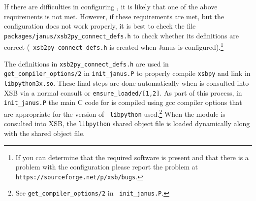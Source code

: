 %
%
%
%
%

If there are difficulties in configuring \janusplg , it is likely that
one of the above requirements is not met.  However, if these
requirements are met, but the configuration does not work properly, it
is best to check the file {\tt packages/janus/xsb2py\_connect\_defs.h}
to check whether its definitions are correct ({\tt
  xsb2py\_connect\_defs.h} is created when Janus is
configured).\footnote{If you can determine that the required software
is present and that there is a problem with the configuration please
report the problem at {\tt https://sourceforge.net/p/xsb/bugs}.}

The definitions in {\tt xsb2py\_connect\_defs.h} are used in {\tt
  get\_compiler\_options/2} in {\tt init\_janus.P} to properly compile
{\tt xsbpy} and link in {\tt libpython3x.so}.  These final steps are
done automatically when \janusplg{} is consulted into XSB via a normal
consult or {\tt ensure\_loaded/[1,2]}.  As part of this process, in
{\tt init\_janus.P} the main C code for  \janusplg{} is compiled using
gcc compiler options that are appropriate for the version of {\tt
  libpython} used.\footnote{See {\tt get\_compiler\_options/2} in {\tt
  init\_janus.P}.}  When the  \janusplg{} module is consulted into XSB,
the {\tt libpython} shared object file is loaded dynamically along
with the \janus{} shared object file.

%
%

